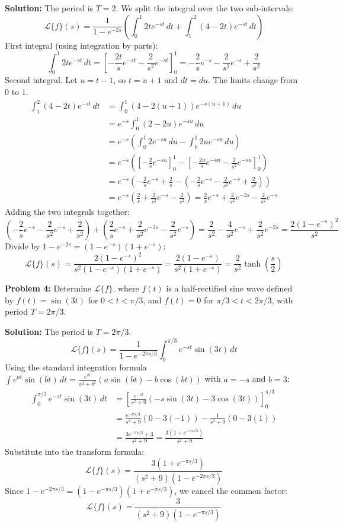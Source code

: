 \documentclass[11pt, letterpaper]{article}
\theoremstyle{definition}
\theoremstyle{remark}
\begin{document}
\textbf{Solution:}
The period is $T = 2$. We split the integral over the two sub-intervals:
\[ \mathcal{L}\{f\}(s) = \frac{1}{1 - e^{-2s}} \left( \int_0^1 2t e^{-st} \,dt + \int_1^2 (4 - 2t) e^{-st} \,dt \right) \]
First integral (using integration by parts):
\[ \int_0^1 2t e^{-st} \,dt = \left[ -\frac{2t}{s} e^{-st} - \frac{2}{s^2} e^{-st} \right]_0^1 = -\frac{2}{s} e^{-s} - \frac{2}{s^2} e^{-s} + \frac{2}{s^2} \]
Second integral. Let $u = t - 1$, so $t = u + 1$ and $dt = du$. The limits change from $0$ to $1$.
\begin{align*}
\int_1^2 (4 - 2t) e^{-st} \,dt &= \int_0^1 (4 - 2(u+1)) e^{-s(u+1)} \,du \\
&= e^{-s} \int_0^1 (2 - 2u) e^{-su} \,du \\
&= e^{-s} \left( \int_0^1 2 e^{-su} \,du - \int_0^1 2u e^{-su} \,du \right) \\
&= e^{-s} \left( \left[ -\frac{2}{s} e^{-su} \right]_0^1 - \left[ -\frac{2u}{s} e^{-su} - \frac{2}{s^2} e^{-su} \right]_0^1 \right) \\
&= e^{-s} \left( -\frac{2}{s} e^{-s} + \frac{2}{s} - \left( -\frac{2}{s} e^{-s} - \frac{2}{s^2} e^{-s} + \frac{2}{s^2} \right) \right) \\
&= e^{-s} \left( \frac{2}{s} + \frac{2}{s^2} e^{-s} - \frac{2}{s^2} \right) = \frac{2}{s} e^{-s} + \frac{2}{s^2} e^{-2s} - \frac{2}{s^2} e^{-s}
\end{align*}
Adding the two integrals together:
\[ \left( -\frac{2}{s} e^{-s} - \frac{2}{s^2} e^{-s} + \frac{2}{s^2} \right) + \left( \frac{2}{s} e^{-s} + \frac{2}{s^2} e^{-2s} - \frac{2}{s^2} e^{-s} \right) = \frac{2}{s^2} - \frac{4}{s^2} e^{-s} + \frac{2}{s^2} e^{-2s} = \frac{2(1 - e^{-s})^2}{s^2} \]
Divide by $1 - e^{-2s} = (1 - e^{-s})(1 + e^{-s})$:
\[ \mathcal{L}\{f\}(s) = \frac{2(1 - e^{-s})^2}{s^2(1 - e^{-s})(1 + e^{-s})} = \frac{2(1 - e^{-s})}{s^2(1 + e^{-s})} = \frac{2}{s^2} \tanh\left(\frac{s}{2}\right) \]

\vspace{1em}
\textbf{Problem 4:} Determine $\mathcal{L}\{f\}$, where $f(t)$ is a half-rectified sine wave defined by $f(t) = \sin(3t)$ for $0 < t < \pi/3$, and $f(t) = 0$ for $\pi/3 < t < 2\pi/3$, with period $T = 2\pi/3$.

\textbf{Solution:}
The period is $T = 2\pi/3$.
\[ \mathcal{L}\{f\}(s) = \frac{1}{1 - e^{-2\pi s / 3}} \int_0^{\pi/3} e^{-st} \sin(3t) \,dt \]
Using the standard integration formula $\int e^{at} \sin(bt) \,dt = \frac{e^{at}}{a^2+b^2} (a \sin(bt) - b \cos(bt))$ with $a = -s$ and $b = 3$:
\begin{align*}
\int_0^{\pi/3} e^{-st} \sin(3t) \,dt &= \left[ \frac{e^{-st}}{s^2 + 9} (-s \sin(3t) - 3 \cos(3t)) \right]_0^{\pi/3} \\
&= \frac{e^{-\pi s / 3}}{s^2 + 9} (0 - 3(-1)) - \frac{1}{s^2 + 9} (0 - 3(1)) \\
&= \frac{3 e^{-\pi s / 3} + 3}{s^2 + 9} = \frac{3(1 + e^{-\pi s / 3})}{s^2 + 9}
\end{align*}
Substitute into the transform formula:
\[ \mathcal{L}\{f\}(s) = \frac{3(1 + e^{-\pi s / 3})}{(s^2 + 9)(1 - e^{-2\pi s / 3})} \]
Since $1 - e^{-2\pi s / 3} = (1 - e^{-\pi s / 3})(1 + e^{-\pi s / 3})$, we cancel the common factor:
\[ \mathcal{L}\{f\}(s) = \frac{3}{(s^2 + 9)(1 - e^{-\pi s / 3})} \]
\end{document}
